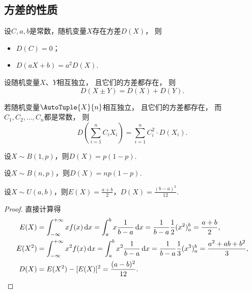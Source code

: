 \subsection{方差的性质}
\begin{property}\label{theorem:随机变量的数字特征.方差的性质1}
设\(C,a,b\)是常数，随机变量\(X\)存在方差\(D(X)\)，
则\begin{itemize}
	\item \(D(C) = 0\)；
	\item \(D(aX+b) = a^2 D(X)\).
\end{itemize}
\end{property}

\begin{property}\label{theorem:随机变量的数字特征.方差的性质2}
设随机变量\(X\)、\(Y\)相互独立，
且它们的方差都存在，
则\[
	D(X \pm Y) = D(X) + D(Y).
\]
\end{property}

\begin{corollary}
若随机变量\(\AutoTuple{X}{n}\)相互独立，
且它们的方差都存在，
而\(C_1,C_2,\dotsc,C_n\)都是常数，
则\[
	D\left( \sum_{i=1}^n C_i X_i \right)
	= \sum_{i=1}^n C_i^2 \cdot D(X_i).
\]
\end{corollary}

\begin{theorem}
设\(X \sim B(1,p)\)，则\(D(X) = p(1-p)\).
\end{theorem}

\begin{theorem}%
设\(X \sim B(n,p)\)，则\(D(X) = np(1-p)\).
\end{theorem}

\begin{theorem}%
设\(X \sim U(a,b)\)，则\(E(X) = \frac{a+b}{2}\)，\(D(X) = \frac{(b-a)^2}{12}\).
\begin{proof}
直接计算得
\begin{align*}
E(X) &= \int_{-\infty}^{+\infty} x f(x) \dd{x}
= \int_a^b x \frac{1}{b-a} \dd{x}
= \frac{1}{b-a} \frac{1}{2} (x^2)_a^b
= \frac{a+b}{2}, \\
E(X^2) &= \int_{-\infty}^{+\infty} x^2 f(x) \dd{x}
= \int_a^b x^2 \frac{1}{b-a} \dd{x}
= \frac{1}{b-a} \frac{1}{3} (x^3)_a^b
= \frac{a^2+ab+b^2}{3}, \\
D(X) &= E(X^2) - [E(X)]^2
= \frac{(a-b)^2}{12}.
\qedhere
\end{align*}
\end{proof}
\end{theorem}

